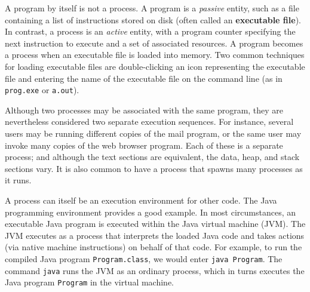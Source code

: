 A program by itself is not a process. A program is a \textit{passive} entity, such as a file containing a list of instructions stored on disk (often called an \textbf{executable file}). In contrast, a process is an \textit{active} entity, with a program counter specifying the next instruction to execute and a set of associated resources. A program becomes a process when an executable file is loaded into memory. Two common techniques for loading executable files are double-clicking an icon representing the executable file and entering the name of the executable file on the command line (as in \texttt{prog.exe} or \texttt{a.out}).

Although two processes may be associated with the same program, they are nevertheless considered two separate execution sequences. For instance, several users may be running different copies of the mail program, or the same user may invoke many copies of the web browser program. Each of these is a separate process; and although the text sections are equivalent, the data, heap, and stack sections vary. It is also common to have a process that spawns many processes as it runs.

A process can itself be an execution environment for other code. The Java programming environment provides a good example. In most circumstances, an executable Java program is executed within the Java virtual machine (JVM). The JVM executes as a process that interprets the loaded Java code and takes actions (via native machine instructions) on behalf of that code. For example, to run the compiled Java program \texttt{Program.class}, we would enter \texttt{java Program}. The command \texttt{java} runs the JVM as an ordinary process, which in turns executes the Java program \texttt{Program} in the virtual machine.

